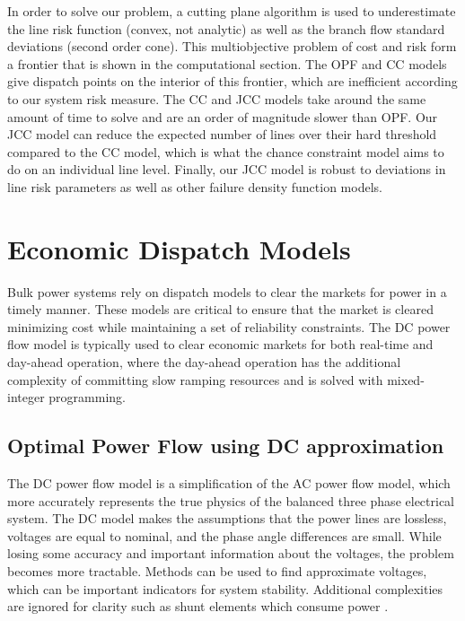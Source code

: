 In order to solve our problem, a cutting plane algorithm is used to underestimate the line risk function (convex, not analytic) as well as the branch flow standard deviations (second order cone).  This multiobjective problem of cost and risk form a frontier that is shown in the computational section.  The OPF and CC models give dispatch points on the interior of this frontier, which are inefficient according to our system risk measure.  The CC and JCC models take around the same amount of time to solve and are an order of magnitude slower than OPF.  Our JCC model can reduce the expected number of lines over their hard threshold compared to the CC model, which is what the chance constraint model aims to do on an individual line level.  Finally, our JCC model is robust to deviations in line risk parameters as well as other failure density function models. 




\section{Economic Dispatch Models}\label{economicdispatch}
Bulk power systems rely on dispatch models to clear the markets for power in a timely manner.  These models are critical to ensure that the market is cleared minimizing cost while maintaining a set of reliability constraints. The DC power flow model is typically used to clear economic markets for both real-time and day-ahead operation, where the day-ahead operation has the additional complexity of committing slow ramping resources and is solved with mixed-integer programming. 


\subsection{Optimal Power Flow using DC approximation} 
The DC power flow model is a simplification of the AC power flow model, which more accurately represents the true physics of the balanced three phase electrical system.  The DC model makes the assumptions that the power lines are lossless, voltages are equal to nominal, and the phase angle differences are small.  While losing some accuracy and important information about the voltages, the problem becomes more tractable.  Methods can be used to find approximate voltages, which can be important indicators for system stability.  Additional complexities are  ignored for clarity such as shunt elements which consume power \cite{matpower}.

